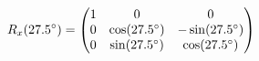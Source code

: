 \documentclass[preview]{standalone}
\begin{document}
\begin{align*}
\special{dvisvgm:raw <g id='unique000'>}R_x(27.5^\circ) = \begin{pmatrix} 1 & 0 & 0 \\ 0 & \cos(27.5^\circ) & -\sin(27.5^\circ) \\ 0 & \sin(27.5^\circ) & \cos(27.5^\circ) \end{pmatrix}\special{dvisvgm:raw </g>}
\end{align*}
\end{document}
